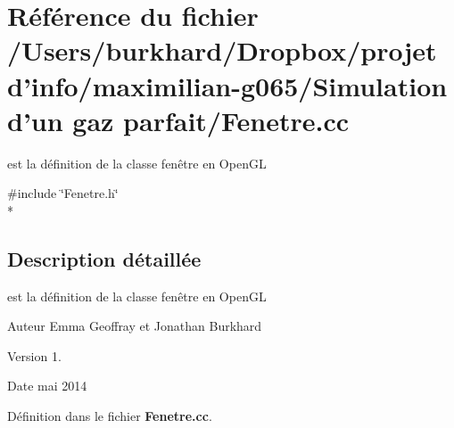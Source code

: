 \section{Référence du fichier /\+Users/burkhard/\+Dropbox/projet d'info/maximilian-\/g065/\+Simulation d'un gaz parfait/\+Fenetre.cc}
\label{_fenetre_8cc}


est la définition de la classe fenêtre en Open\+G\+L  


{\ttfamily \#include \char`\"{}Fenetre.\+h\char`\"{}}\\*


\subsection{Description détaillée}
est la définition de la classe fenêtre en Open\+G\+L 

\begin{DoxyAuthor}{Auteur}
Emma Geoffray et Jonathan Burkhard 
\end{DoxyAuthor}
\begin{DoxyVersion}{Version}
1. 
\end{DoxyVersion}
\begin{DoxyDate}{Date}
mai 2014 
\end{DoxyDate}


Définition dans le fichier {\bf Fenetre.\+cc}.

